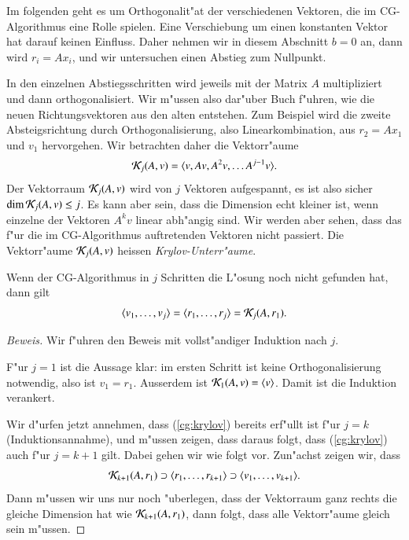 {\small

Im folgenden geht es um Orthogonalit"at der verschiedenen Vektoren, die
im CG-Algorithmus eine Rolle spielen.
Eine Verschiebung um einen konstanten Vektor hat darauf keinen Einfluss.
Daher nehmen wir in diesem Abschnitt $b=0$ an, dann wird $r_i=Ax_i$,
und wir untersuchen einen Abstieg zum Nullpunkt.

In den einzelnen Abstiegsschritten wird jeweils mit der Matrix $A$
multipliziert und dann orthogonalisiert.
Wir m"ussen also dar"uber Buch f"uhren, wie die neuen Richtungsvektoren
aus den alten entstehen.
Zum Beispiel wird die zweite Absteigsrichtung durch Orthogonalisierung, also
Linearkombination, aus 
$r_2 = Ax_1$ und $v_1$ hervorgehen.
Wir betrachten daher die Vektorr"aume
\[
{\cal K}_j(A,v)=\langle v,Av,A^2v,\dots A^{j-1}v\rangle.
\]
Der Vektorraum ${\cal K}_j(A,v)$ wird von $j$ Vektoren aufgespannt,
es ist also sicher $\operatorname{dim}{\cal K}_j(A,v)\le j$.
Es kann aber sein, dass die Dimension echt kleiner ist, wenn einzelne
der Vektoren $A^kv$ linear abh"angig sind. Wir werden aber sehen, dass
das f"ur die im CG-Algorithmus auftretenden Vektoren nicht passiert.
Die Vektorr"aume ${\cal K}_j(A,v)$ heissen {\em Krylov-Unterr"aume}.

\begin{satz}
\label{cg:krylovsatz}
Wenn der CG-Algorithmus in $j$ Schritten die L"osung noch nicht gefunden
hat, dann gilt
\begin{equation}
\langle v_1,\dots,v_j\rangle = \langle r_1,\dots,r_j\rangle
= {\cal K}_j(A,r_1).
\label{cg:krylov}
\end{equation}
\end{satz}

\begin{proof}[Beweis]
Wir f"uhren den Beweis mit vollst"andiger Induktion nach $j$.

F"ur $j=1$ ist die Aussage klar: im ersten Schritt ist keine
Orthogonalisierung notwendig, also ist $v_1=r_1$. 
Ausserdem ist ${\cal K}_1(A,v)=\langle v\rangle$.
Damit ist die Induktion verankert.

Wir d"urfen jetzt annehmen, dass (\ref{cg:krylov}) bereits erf"ullt ist
f"ur $j=k$ (Induktionsannahme), und m"ussen zeigen, dass daraus folgt,
dass (\ref{cg:krylov}) auch f"ur $j=k+1$ gilt. Dabei gehen wir wie folgt
vor. Zun"achst zeigen wir, dass
\begin{equation}
{\cal K}_{k+1}(A,r_1)
\supset
\langle r_1,\dots,r_{k+1}\rangle
\supset 
\langle v_1,\dots,v_{k+1}\rangle.
\label{cg:inclusions}
\end{equation}
Dann m"ussen wir uns nur noch "uberlegen, dass der Vektorraum ganz rechts
die gleiche Dimension hat wie ${\cal K}_{k+1}(A,r_1)$, dann folgt, dass
alle Vektorr"aume gleich sein m"ussen.


\end{proof}}
